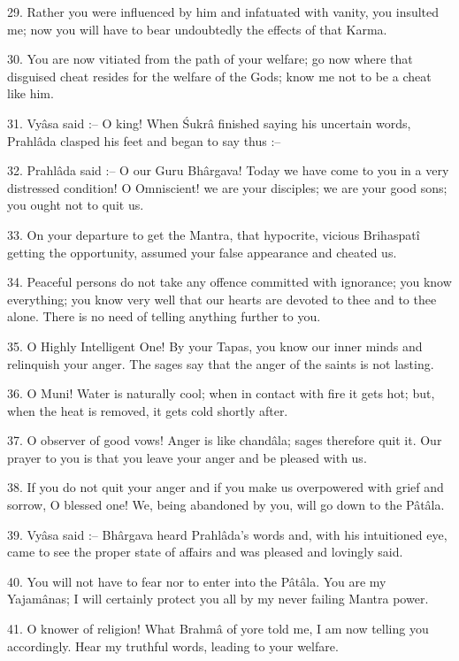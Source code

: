 29. Rather you were influenced by him and infatuated with vanity, you insulted me; now you will have to bear undoubtedly the effects of that Karma.

30. You are now vitiated from the path of your welfare; go now where that disguised cheat resides for the welfare of the Gods; know me not to be a cheat like him.

31. Vy\^asa said :-- O king! When \'Sukr\^a finished saying his uncertain words, Prahl\^ada clasped his feet and began to say thus :--

32. Prahl\^ada said :-- O our Guru Bh\^argava! Today we have come to you in a very distressed condition! O Omniscient! we are your disciples; we are your good sons; you ought not to quit us.

33. On your departure to get the Mantra, that hypocrite, vicious Brihaspat\^i getting the opportunity, assumed your false appearance and cheated us.

34. Peaceful persons do not take any offence committed with ignorance; you know everything; you know very well that our hearts are devoted to thee and to thee alone. There is no need of telling anything further to you.

35. O Highly Intelligent One! By your Tapas, you know our inner minds and relinquish your anger. The sages say that the anger of the saints is not lasting.

36. O Muni! Water is naturally cool; when in contact with fire it gets hot; but, when the heat is removed, it gets cold shortly after.

37. O observer of good vows! Anger is like chand\^ala; sages therefore quit it. Our prayer to you is that you leave your anger and be pleased with us.

38. If you do not quit your anger and if you make us overpowered with grief and sorrow, O blessed one! We, being abandoned by you, will go down to the P\^at\^ala.

39. Vy\^asa said :-- Bh\^argava heard Prahl\^ada's words and, with his intuitioned eye, came to see the proper state of affairs and was pleased and lovingly said.

40. You will not have to fear nor to enter into the P\^at\^ala. You are my Yajam\^anas; I will certainly protect you all by my never failing Mantra power.

41. O knower of religion! What Brahm\^a of yore told me, I am now telling you accordingly. Hear my truthful words, leading to your welfare.

